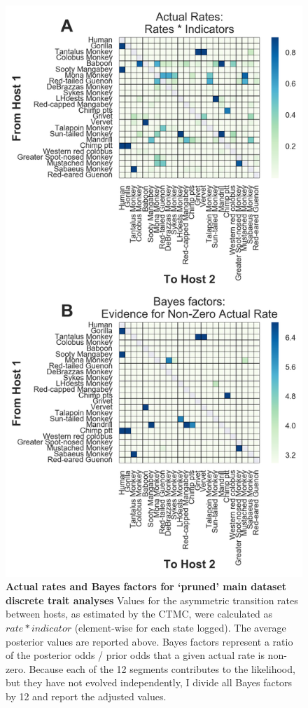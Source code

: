 \begin{figure}[h!]
  \begin{centering}
    \includegraphics[width=.6\linewidth]{./png/siv_pruneddata_transmissions.png}
  	\caption[Pairwise host transmission rates (`pruned' dataset)]{\textbf{Actual rates and Bayes factors for `pruned' main dataset discrete trait analyses }
    Values for the asymmetric transition rates between hosts, as estimated by the CTMC, were calculated as $rate * indicator$ (element-wise for each state logged).
    The average posterior values are reported above.
    Bayes factors represent a ratio of the posterior odds / prior odds that a given actual rate is non-zero.
    Because each of the 12 segments contributes to the likelihood, but they have not evolved independently, I divide all Bayes factors by 12 and report the adjusted values.
        }
  	\label{siv_pruneddata_transmissions}
  \end{centering}
\end{figure}

